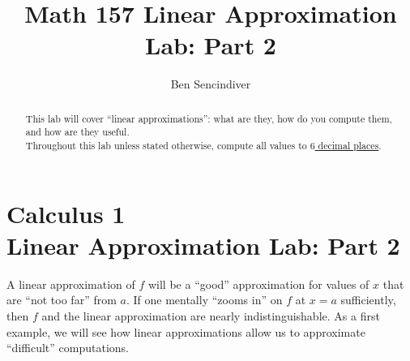 \documentclass[handout,nooutcomes]{ximera}
\title{Math 157 Linear Approximation Lab: Part 2}
\author{Ben Sencindiver} %
\begin{document}
\section{Calculus 1\\ Linear Approximation Lab: Part 2}

\begin{abstract}
This lab will cover ``linear approximations'': what are they,
how do you compute them, and how are they useful.\\

Throughout this lab unless stated otherwise, compute all values to \underline{$6$ decimal places}.
\end{abstract}

\maketitle


A linear approximation of $f$ will be a ``good'' approximation for values of
$x$ that are ``not too far'' from $a$.
If one mentally ``zooms in'' on $f$ at $x=a$ sufficiently, then $f$ and the linear
approximation are nearly indistinguishable. As a first example, we
will see how linear approximations allow us to approximate
``difficult'' computations.
\end{document}
